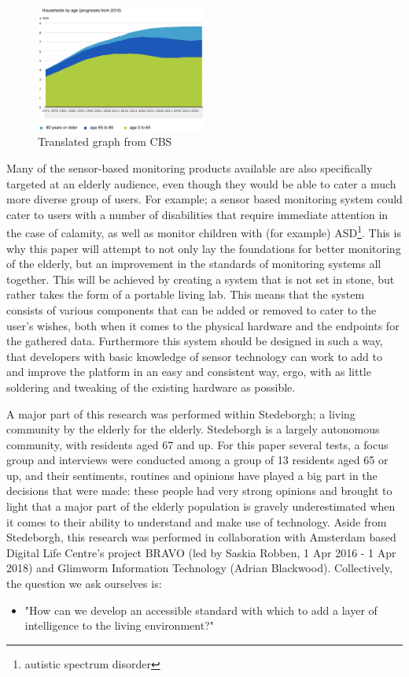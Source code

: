 \documentclass{below-ext}
\begin{document}
\begin{figure}
\centering
\includegraphics[width=0.5\textwidth]{cbs_household_age_report}
\caption[Translated graph]{Translated graph from CBS\footnotemark }
\label{fig:cbs}
\end{figure}
Many of the sensor-based monitoring products available are also specifically targeted at an elderly audience, even though they would be able to cater a much more diverse group of users. For example; a sensor based monitoring system could cater to users with a number of disabilities that require immediate attention in the case of calamity, as well as monitor children with (for example)  ASD\footnote{autistic spectrum disorder}. This is why this paper will attempt to not only lay the foundations for better monitoring of the elderly, but an improvement in the standards of monitoring systems all together. This will be achieved by creating a system that is not set in stone, but rather takes the form of a portable living lab. This means that the system consists of various components that can be added or removed to cater to the user's wishes, both when it comes to the physical hardware and the endpoints for the gathered data. Furthermore this system should be designed in such a way, that developers with basic knowledge of sensor technology can work to add to and improve the platform in an easy and consistent way, ergo, with as little soldering and tweaking of the existing hardware as possible.

A major part of this research was performed within Stedeborgh; a living community by the elderly for the elderly. Stedeborgh is a largely autonomous community, with residents aged 67 and up. For this paper several tests, a focus group and interviews were conducted among a group of 13 residents aged 65 or up, and their sentiments, routines and opinions have played a big part in the decisions that were made: these people had very strong opinions and brought to light that a major part of the elderly population is gravely underestimated when it comes to their ability to understand and make use of technology. Aside from Stedeborgh, this research was performed in collaboration with Amsterdam based Digital Life Centre's project BRAVO (led by Saskia Robben, 1 Apr 2016 - 1 Apr 2018) and Glimworm Information Technology (Adrian Blackwood). Collectively, the question we ask ourselves is: 
\begin{itemize}
\item"How can we develop an accessible standard with which to add a layer of intelligence to the living environment?" 
\end{itemize}
\end{document}
